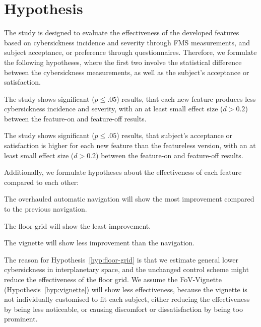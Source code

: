 \section{Hypothesis}\label{sec:hypothesis}

The study is designed to evaluate the effectiveness of the developed features based on cybersickness incidence and
severity through FMS measurements, and subject acceptance, or preference through questionnaires.
Therefore, we formulate the following hypotheses, where the first two involve the statistical difference between
the cybersickness measurements, as well as the subject's acceptance or satisfaction.
\begin{hypothesis}
    \label{hyp:cybersickness}
    The study shows significant ($p \leq .05$) results, that each new feature produces less cybersickness incidence
    and
    severity, with an at least small effect size ($d > 0.2$) between the feature-on and feature-off results.
\end{hypothesis}
\begin{hypothesis}
    \label{hyp:satisfaction}
    The study shows significant ($p \leq .05$) results, that subject's acceptance or satisfaction is higher for each new
    feature than the featureless version, with an at least small effect size ($d > 0.2$) between the feature-on and
    feature-off results.
\end{hypothesis}

Additionally, we formulate hypotheses about the effectiveness of each feature compared to each other:
\begin{hypothesis}
    \label{hyp:navigation}
    The overhauled automatic navigation will show the most improvement compared to the previous navigation.
\end{hypothesis}
\begin{hypothesis}
    \label{hyp:floor-grid}
    The floor grid will show the least improvement.
\end{hypothesis}
\begin{hypothesis}
    \label{hyp:vignette}
    The vignette will show less improvement than the navigation.
\end{hypothesis}
The reason for Hypothesis~\ref{hyp:floor-grid} is that we estimate general lower cybersickness in interplanetary
space, and the unchanged control scheme might reduce the effectiveness of the floor grid.
We assume the FoV-Vignette (Hypothesis~\ref{hyp:vignette}) will show less effectiveness, because the vignette is not
individually customised to fit each subject, either reducing the effectiveness by being less noticeable, or causing
discomfort or dissatisfaction by being too prominent.

